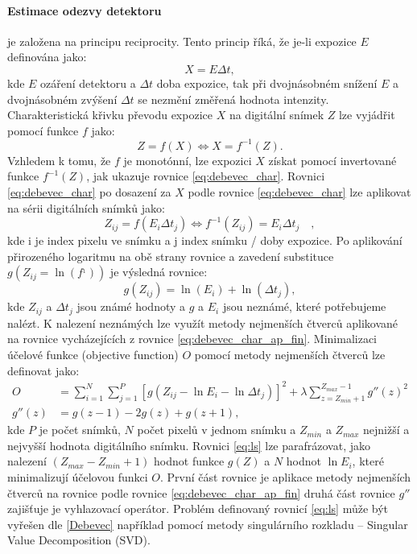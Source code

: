 \paragraph{Estimace odezvy detektoru} je založena na principu reciprocity. Tento princip říká, že je-li expozice $E$ definována jako:
\begin{equation}
\label{eq:debevec_reciprocity}
X = E \Delta t , 
\end{equation}
kde $E$ ozáření detektoru a $\Delta t$ doba expozice, tak při dvojnásobném snížení $E$ a dvojnásobném zvýšení $\Delta t$ se nezmění změřená hodnota intenzity. Charakteristická křivku převodu expozice $X$ na digitální snímek $Z$ lze vyjádřit pomocí funkce $f$ jako:
\begin{equation}
\label{eq:debevec_char}
Z=f\left (X \right ) \Leftrightarrow X = f^{-1}\left ( Z\right ). 
\end{equation}
Vzhledem k tomu, že $f$ je monotónní, lze expozici $X$ získat pomocí invertované funkce $f^{-1}(Z)$, jak ukazuje rovnice \ref{eq:debevec_char}. Rovnici \ref{eq:debevec_char} po dosazení za $X$ podle rovnice \ref{eq:debevec_char} lze aplikovat na sérii digitálních snímků jako:
\begin{equation}
\label{eq:debevec_char_ap}
Z_{ij}=f\left (E_i\Delta t_j \right ) \Leftrightarrow f^{-1}\left ( Z_{ij}\right ) = E_i \Delta t_j\quad,
\end{equation}
kde i je index pixelu ve snímku a j index snímku / doby expozice. Po aplikování přirozeného logaritmu na obě strany rovnice a zavedení substituce  $g(Z_{ij} = \ln\left( f^{_1} \right))$ je výsledná rovnice:
\begin{equation}
\label{eq:debevec_char_ap_fin}
g \left( Z_{ij} \right) = \ln \left( E_i \right)  + \ln \left( \Delta t_j \right),
\end{equation}
kde $Z_{ij}$ a $\Delta t_j$ jsou známé hodnoty a $g$ a $E_i$ jsou neznámé, které potřebujeme nalézt. K nalezení neznámých lze využít metody nejmenších čtverců aplikované na rovnice vycházejících z rovnice \ref{eq:debevec_char_ap_fin}. Minimalizaci účelové funkce (objective function) $O$ pomocí metody nejmenších čtverců lze definovat jako:
\begin{align}
\label{eq:ls}
O &= \sum_{i=1}^{N} \sum_{j=1}^{P} \left [g \left(Z_{ij}-\ln E_i - \ln\Delta t_j \right ) \right ]^2 
+ \lambda \sum_{z=Z_{min}+1}^{Z_{max}-1}{g}'' \left(z \right )^2 \\
{g}'' \left(z \right ) &= g\left(z-1 \right ) - 2g \left(z \right ) + g\left( z+1 \right ),
\end{align}
kde $P$ je počet snímků, $N$ počet pixelů v jednom snímku a $Z_{min}$ a $Z_{max}$ nejnižší a nejvyšší hodnota digitálního snímku. Rovnici \ref{eq:ls} lze parafrázovat, jako nalezení $\left( Z_{max} - Z_{min} + 1\right)$ hodnot funkce $g \left( Z\right)$ a $N$ hodnot $\ln E_i$, které minimalizují účelovou funkci $O$. První část rovnice je aplikace metody nejmenších čtverců na rovnice podle rovnice \ref{eq:debevec_char_ap_fin} druhá část rovnice ${g}''$ zajišťuje je vyhlazovací operátor. Problém definovaný rovnicí \ref{eq:ls} může být vyřešen dle \cref{Debevec} například pomocí metody singulárního rozkladu -- Singular Value Decomposition (SVD).

